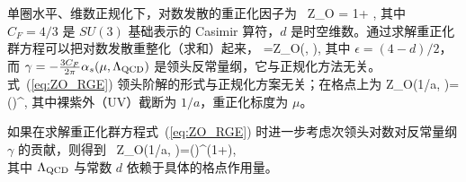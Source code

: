 单圈水平、维数正规化下，对数发散的重正化因子为~\cite{Ji:2020ect,Constantinou:2017sej}
\bea\label{eq:ZO}
Z_{O} = 1+ ,
\eea
其中 $C_{F}=4/3$ 是 $SU(3)$ 基础表示的 Casimir 算符，$d$ 是时空维数。通过求解重正化群方程可以把对数发散重整化（求和）起来，
\bea\label{eq:ZO_RGE}
=\gamma Z_{O}(\epsilon, \mu),
\eea
其中 $\epsilon=(4-d)/2$，而 $\gamma=-\frac{3 C_{F}}{2 \pi} \alpha_{s}(\mu, \Lambda_{\rm QCD})$ 是领头反常量纲，它与正规化方法无关。式~(\ref{eq:ZO_RGE}) 领头阶解的形式与正规化方案无关；在格点上为
\bea\label{eq:ZO_RS}
Z_{O}(1/a, \mu)=\left(\right)^{},
\eea
其中裸紫外（UV）截断为 $1/a$，重正化标度为 $\mu$。

如果在求解重正化群方程式~(\ref{eq:ZO_RGE}) 时进一步考虑次领头对数对反常量纲 $\gamma$ 的贡献，则得到~\cite{Ji:1991pr}
\bea\label{eq:ZO_RS_higher}
Z_{O}(1/a, \mu)=\left(\right)^{}\left(1+\right),\nonumber\\
\eea
其中 $\Lambda_{\rm QCD}$ 与常数 $d$ 依赖于具体的格点作用量。
